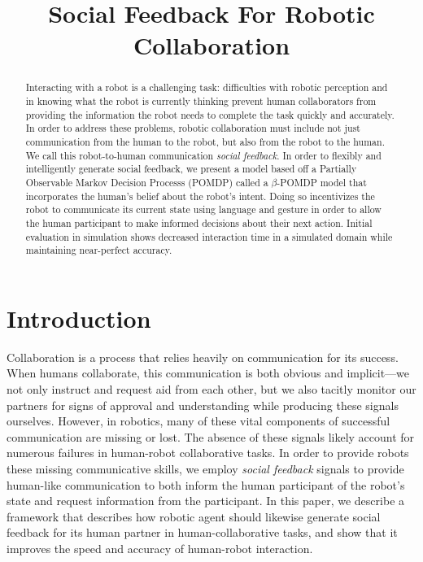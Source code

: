 \documentclass[conference]{IEEEtran}
\begin{document}
\title{Social Feedback For Robotic Collaboration}

\author{
}

\maketitle


\begin{abstract}
	Interacting with a robot is a challenging task: difficulties with robotic perception and in knowing what the robot is currently thinking prevent human collaborators from providing the information the robot needs to complete the task quickly and accurately. In order to address these problems, robotic collaboration must include not just communication from the human to the robot, but also from the robot to the human. We call this robot-to-human communication \emph{social feedback}. In order to flexibly and intelligently generate social feedback, we present a model based off a Partially Observable Markov Decision Processs (POMDP) called a $\beta$-POMDP model that incorporates the human's belief about the robot's intent. Doing so incentivizes the robot to communicate its current state using language and gesture in order to allow the human participant to make informed decisions about their next action. Initial evaluation in simulation shows decreased interaction time in a simulated domain while maintaining near-perfect accuracy. 
\end{abstract}

	
\section{Introduction}

Collaboration is a process that relies heavily on communication for its success. When humans collaborate, this communication is both obvious and implicit---we not only instruct and request aid from each other, but we also tacitly monitor our partners for signs of approval and understanding while producing these signals ourselves. However, in robotics, many of these vital components of successful communication are missing or lost. The absence of these signals likely account for numerous failures in human-robot collaborative tasks. In order to provide robots these missing communicative skills, we employ \emph{social feedback} signals to provide human-like communication to both inform the human participant of the robot's state and request information from the participant. In this paper, we describe a  framework that describes how robotic agent should likewise generate social feedback for its human partner in human-collaborative tasks, and show that it improves the speed and accuracy of human-robot interaction. 
\end{document}
